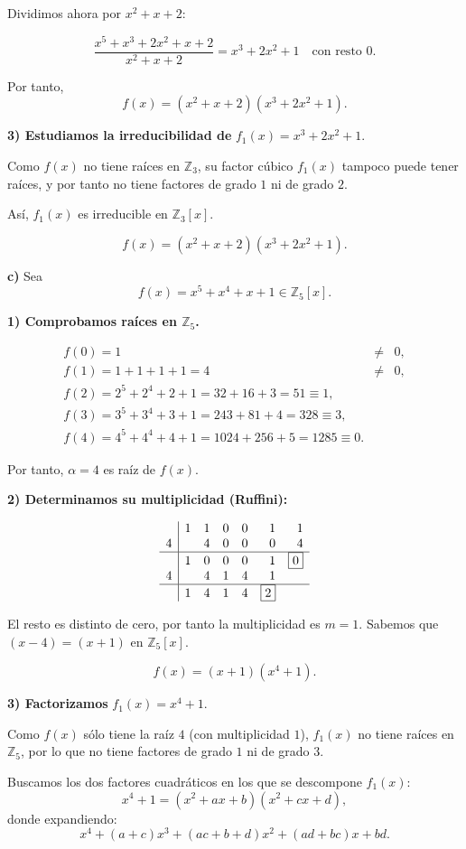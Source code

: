 \documentclass[a4paper,12pt]{article}
\begin{document}
\begin{ejercicio}[title=Ejercicio 52]

Dividimos ahora por $x^2 + x + 2$:

\[
\dfrac{x^5 + x^3 + 2x^2 + x + 2}{x^2 + x + 2} = x^3 + 2x^2 + 1 \quad \text{con resto } 0.
\]

Por tanto,
\[
f(x) = (x^2 + x + 2)(x^3 + 2x^2 + 1).
\]

\vspace{0.5em}
\textbf{3) Estudiamos la irreducibilidad de } \(f_1(x) = x^3 + 2x^2 + 1.\)

Como $f(x)$ no tiene raíces en $\mathbb{Z}_3$, su factor cúbico $f_1(x)$ tampoco puede tener raíces, y por tanto no tiene factores de grado $1$ ni de grado $2$.

Así, $f_1(x)$ es irreducible en $\mathbb{Z}_3[x]$.

\[
\boxed{f(x) = (x^2 + x + 2)(x^3 + 2x^2 + 1).}
\]

\textbf{c)} Sea 
\[
f(x) = x^5 + x^4 + x + 1 \in \mathbb{Z}_5[x].
\]

\textbf{1) Comprobamos raíces en $\mathbb{Z}_5$.}

\[
\begin{array}{lcl}
f(0) = 1 &\neq& 0, \\
f(1) = 1 + 1 + 1 + 1 = 4 &\neq& 0, \\
f(2) = 2^5 + 2^4 + 2 + 1 = 32 + 16 + 3 = 51 \equiv 1, \\
f(3) = 3^5 + 3^4 + 3 + 1 = 243 + 81 + 4 = 328 \equiv 3, \\
f(4) = 4^5 + 4^4 + 4 + 1 = 1024 + 256 + 5 = 1285 \equiv 0.
\end{array}
\]

Por tanto, $\alpha = 4$ es raíz de $f(x)$.

\vspace{0.5em}
\textbf{2) Determinamos su multiplicidad (Ruffini):}

\[
\begin{array}{r|rrrrrr}
  & 1 & 1 & 0 & 0 & 1 & 1 \\
4 &   & 4 & 0 & 0 & 0 & 4 \\
\hline
  & 1 & 0 & 0 & 0 & 1 & \boxed{0} \\
4 &   & 4 & 1 & 4 & 1 \\
\hline
  & 1 & 4 & 1 & 4 & \boxed{2}
\end{array}
\]

El resto es distinto de cero, por tanto la multiplicidad es \(m = 1\).  
Sabemos que \((x - 4) = (x + 1)\) en \(\mathbb{Z}_5[x]\).

\[
f(x) = (x + 1)(x^4 + 1).
\]

\vspace{0.5em}
\textbf{3) Factorizamos } \(f_1(x) = x^4 + 1.\)

Como \(f(x)\) sólo tiene la raíz \(4\) (con multiplicidad \(1\)), \(f_1(x)\) no tiene raíces en \(\mathbb{Z}_5\), por lo que no tiene factores de grado \(1\) ni de grado \(3\).

Buscamos los dos factores cuadráticos en los que se descompone \(f_1(x)\):
\[
x^4 + 1 = (x^2 + ax + b)(x^2 + cx + d),
\]
donde expandiendo:
\[
x^4 + (a + c)x^3 + (ac + b + d)x^2 + (ad + bc)x + bd.
\]
\end{ejercicio}
\end{document}
